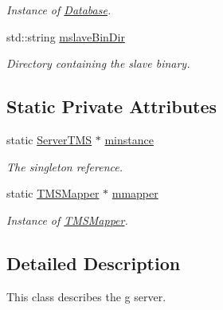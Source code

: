 \begin{DoxyCompactItemize}
\begin{DoxyCompactList}\small\item\em Instance of \hyperlink{classDatabase}{Database}. \item\end{DoxyCompactList}\item 
\hypertarget{classServerTMS_afbeadf53934e0225351917c5db575775}{
std::string \hyperlink{classServerTMS_afbeadf53934e0225351917c5db575775}{mslaveBinDir}}
\label{classServerTMS_afbeadf53934e0225351917c5db575775}

\begin{DoxyCompactList}\small\item\em Directory containing the slave binary. \item\end{DoxyCompactList}\end{DoxyCompactItemize}
\subsection*{Static Private Attributes}
\begin{DoxyCompactItemize}
\item 
\hypertarget{classServerTMS_a2f43844e157ceb1212d87c7e6a27ce31}{
static \hyperlink{classServerTMS}{ServerTMS} $\ast$ \hyperlink{classServerTMS_a2f43844e157ceb1212d87c7e6a27ce31}{minstance}}
\label{classServerTMS_a2f43844e157ceb1212d87c7e6a27ce31}

\begin{DoxyCompactList}\small\item\em The singleton reference. \item\end{DoxyCompactList}\item 
\hypertarget{classServerTMS_ae179fa4588fc55578b60d65ccfdced8b}{
static \hyperlink{classTMSMapper}{TMSMapper} $\ast$ \hyperlink{classServerTMS_ae179fa4588fc55578b60d65ccfdced8b}{mmapper}}
\label{classServerTMS_ae179fa4588fc55578b60d65ccfdced8b}

\begin{DoxyCompactList}\small\item\em Instance of \hyperlink{classTMSMapper}{TMSMapper}. \item\end{DoxyCompactList}\end{DoxyCompactItemize}


\subsection{Detailed Description}
This class describes the g server. 

